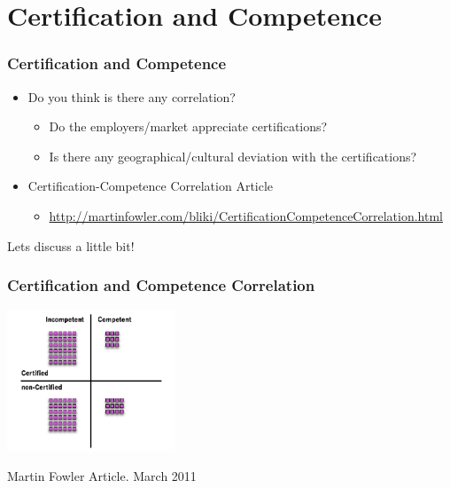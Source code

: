 \documentclass{beamer}
\begin{document}

\section{Certification and Competence}


\begin{frame}
\frametitle{Certification and Competence}
\begin{itemize}
\item Do you think is there any correlation?
    \begin{itemize}
    \item Do the employers/market appreciate certifications?
    \item Is there any geographical/cultural deviation with the certifications?
    \end{itemize}
\item Certification-Competence Correlation Article
    \begin{itemize}
    \item \url{http://martinfowler.com/bliki/CertificationCompetenceCorrelation.html}
    \end{itemize}
\end{itemize}

\begin{center}
\huge{Lets discuss a little bit!}
\end{center}

\end{frame}


\begin{frame}
\frametitle{Certification and Competence Correlation} 
\begin{center}
  \includegraphics[width=5cm]{figs/CertificationCompetence.png}
\end{center}
\begin{center}
  \small{Martin Fowler Article. March 2011}
\end{center}
\end{frame}
\end{document}
